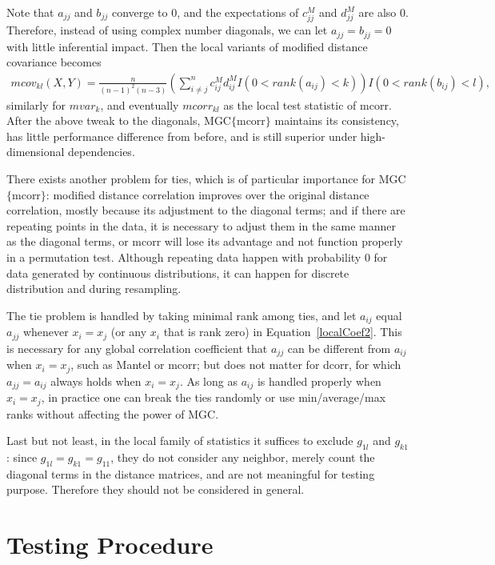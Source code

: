 \documentclass[11pt]{article}
\begin{document}
Note that $a_{jj}$ and $b_{jj}$ converge to $0$, and the expectations of $c^{M}_{jj}$ and $d^{M}_{jj}$ are also $0$. Therefore, instead of using complex number diagonals, we can let $a_{jj}=b_{jj}=0$ with little inferential impact. Then the local variants of modified distance covariance becomes
\begin{align*}
mcov_{kl}(X,Y) = \frac{n}{(n-1)^2(n-3)}(\sum_{i \neq j}^{n}c^{M}_{ij}d^{M}_{ij}I(0<rank(a_{ij})<k))I(0<rank(b_{ij})<l),
\end{align*}
similarly for $mvar_{k}$, and eventually $mcorr_{kl}$ as the local test statistic of mcorr. After the above tweak to the diagonals, MGC$\{$mcorr$\}$ maintains its consistency, has little performance difference from before, and is still superior under high-dimensional dependencies.

There exists another problem for ties, which is of particular importance for MGC$\{$mcorr$\}$: modified distance correlation improves over the original distance correlation, mostly because its adjustment to the diagonal terms; and if there are repeating points in the data, it is necessary to adjust them in the same manner as the diagonal terms, or mcorr will lose its advantage and not function properly in a permutation test. Although repeating data happen with probability $0$ for data generated by continuous distributions, it can happen for discrete distribution and during resampling.

The tie problem is handled by taking minimal rank among ties, and let $a_{ij}$ equal $a_{jj}$ whenever $x_{i}=x_{j}$ (or any $x_{i}$ that is rank zero) in Equation~\ref{localCoef2}. This is necessary for any global correlation coefficient that $a_{jj}$ can be different from $a_{ij}$ when $x_{i}=x_{j}$, such as Mantel or mcorr; but does not matter for dcorr, for which $a_{jj}=a_{ij}$ always holds when $x_{i}=x_{j}$. As long as $a_{ij}$ is handled properly when $x_{i}=x_{j}$, in practice one can break the ties randomly or use min/average/max ranks without affecting the power of MGC.

Last but not least, in the local family of statistics it suffices to exclude $g_{1l}$ and $g_{k1}$: since $g_{1l}=g_{k1}=g_{11}$, they do not consider any neighbor, merely count the diagonal terms in the distance matrices, and are not meaningful for testing purpose. Therefore they should not be considered in general.

\section{Testing Procedure}
\label{appen:tests}
\end{document}
